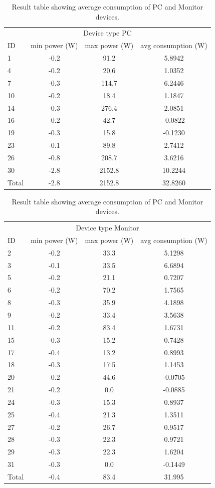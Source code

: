 \begin{table}[h]
	\centering
	\begin{tabular}{l|c|c|c}
		\multicolumn{4}{c}{Device type PC} \\
		ID & min power (W)& max power (W)& avg consumption (W)\\
		1 & -0.2 & 91.2 & 5.8942\\
		4 & -0.2 & 20.6 & 1.0352 \\
		7 & -0.3 & 114.7 & 6.2446 \\
		10 & -0.2 & 18.4 & 1.1847 \\
		14 & -0.3 & 276.4 & 2.0851 \\
		16 & -0.2 & 42.7 & -0.0822 \\
		19 & -0.3 & 15.8 & -0.1230 \\
		23 & -0.1 & 89.8 & 2.7412 \\
		26 & -0.8 & 208.7 & 3.6216 \\
		30 & -2.8 & 2152.8 & 10.2244 \\
		\hline
		Total & -2.8 & 2152.8 & 32.8260 \\
	\end{tabular}
	
	\begin{tabular}{l|c|c|c}
		\multicolumn{4}{c}{Device type Monitor} \\
		ID & min power (W)& max power (W)& avg consumption (W)\\
		2 & -0.2 & 33.3 & 5.1298 \\
		3 & -0.1 & 33.5 & 6.6894 \\
		5 & -0.2 & 21.1 & 0.7207 \\
		6 & -0.2 & 70.2 & 1.7565 \\
		8 & -0.3 & 35.9 & 4.1898 \\
		9 & -0.2 & 33.4 & 3.5638 \\
		11 & -0.2 & 83.4 & 1.6731 \\
		15 & -0.3 & 15.2 & 0.7428 \\
		17 & -0.4 & 13.2 & 0.8993 \\
		18 & -0.3 & 17.5 & 1.1453 \\
		20 & -0.2 & 44.6 & -0.0705 \\
		21 & -0.2 & 0.0 & -0.0885 \\
		24 & -0.3 & 15.3 & 0.8937 \\
		25 & -0.4 & 21.3 & 1.3511 \\
		27 & -0.2 & 26.7 & 0.9517 \\
		28 & -0.3 & 22.3 & 0.9721 \\
		29 & -0.3 & 22.3 & 1.6204 \\
		31 & -0.3 & 0.0 & -0.1449 \\
		\hline
		Total & -0.4 & 83.4 &31.995 \\
	\end{tabular}
	\caption{Result table showing average consumption of PC and Monitor devices.}
	\label{tab:PCMon}
\end{table}
